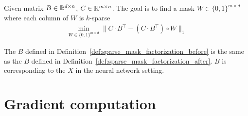 \begin{definition}\label{def:sparse_mask_factorization_after}
Given matrix $B \in \mathbb{R}^{d \times n}$, $C \in \mathbb{R}^{m \times n}$.  The goal is to find a mask $W \in \{0,1\}^{m \times d}$ where each column of $W$ is $k$-sparse 
\begin{align*}
  \min_{W \in \{0,1\}^{m \times d} } \| C \cdot B^\top  - ( C \cdot B^\top ) \circ W \|_1
\end{align*}
\end{definition}

\begin{remark}
The $B$ defined in Definition~\ref{def:sparse_mask_factorization_before} is the same as the $B$ defined in Definition~\ref{def:sparse_mask_factorization_after}. $B$ is corresponding to the $X$ in the neural network setting. %
\end{remark}








\section{Gradient computation}\label{sec:gradient_compute}


